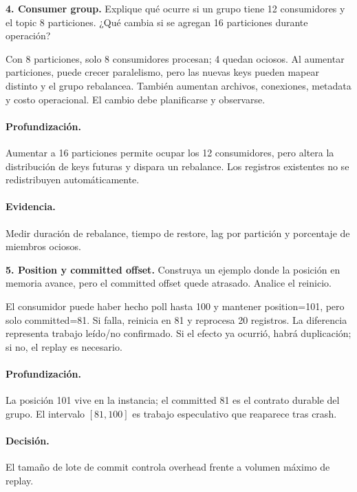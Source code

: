 \documentclass[variant=guiaresuelta,cover=institutional,mode=screen]{ua-engineering-v6-article}
\begin{document}
\begin{uaexercise}
\textbf{4. Consumer group.} Explique qué ocurre si un grupo tiene 12 consumidores y el topic 8 particiones. ¿Qué cambia si se agregan 16 particiones durante operación?
\end{uaexercise}
\begin{uaanswer}
Con 8 particiones, solo 8 consumidores procesan; 4 quedan ociosos. Al aumentar particiones, puede crecer paralelismo, pero las nuevas keys pueden mapear distinto y el grupo rebalancea. También aumentan archivos, conexiones, metadata y costo operacional. El cambio debe planificarse y observarse.

\paragraph{Profundización.} Aumentar a 16 particiones permite ocupar los 12 consumidores, pero altera la distribución de keys futuras y dispara un rebalance. Los registros existentes no se redistribuyen automáticamente.\paragraph{Evidencia.} Medir duración de rebalance, tiempo de restore, lag por partición y porcentaje de miembros ociosos.
\end{uaanswer}
\begin{uaexercise}
\textbf{5. Position y committed offset.} Construya un ejemplo donde la posición en memoria avance, pero el committed offset quede atrasado. Analice el reinicio.
\end{uaexercise}
\begin{uaanswer}
El consumidor puede haber hecho poll hasta 100 y mantener position=101, pero solo committed=81. Si falla, reinicia en 81 y reprocesa 20 registros. La diferencia representa trabajo leído/no confirmado. Si el efecto ya ocurrió, habrá duplicación; si no, el replay es necesario.

\paragraph{Profundización.} La posición 101 vive en la instancia; el committed 81 es el contrato durable del grupo. El intervalo $[81,100]$ es trabajo especulativo que reaparece tras crash.\paragraph{Decisión.} El tamaño de lote de commit controla overhead frente a volumen máximo de replay.
\end{uaanswer}
\end{document}
